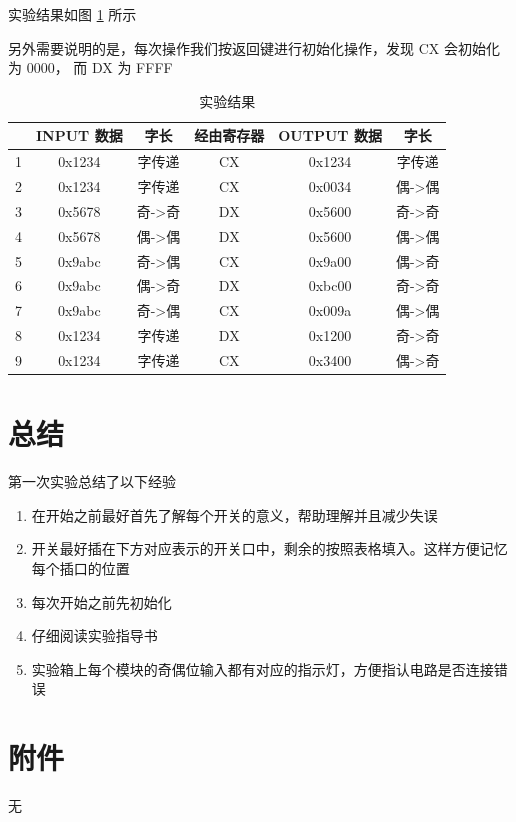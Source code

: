 \documentclass[a4paper,10pt,UTF8]{paper}
\numberwithin{equation}{section}
\numberwithin{figure}{section}
\begin{document}
实验结果如图 \ref{tab:outcome} 所示

另外需要说明的是，每次操作我们按返回键进行初始化操作，发现 CX 会初始化为 0000， 而 DX 为 FFFF

\begin{table}[h]
    \centering
    \begin{tabular}{|c|c|c|c|c|c|}
        \hline  & INPUT 数据 & 字长 & 经由寄存器 & OUTPUT 数据 & 字长 \\
        \hline 1 & 0x1234 & 字传递 & CX & 0x1234 & 字传递 \\
        \hline 2 & 0x1234 & 字传递 & CX & 0x0034 & 偶->偶 \\
        \hline 3 & 0x5678 & 奇->奇 & DX & 0x5600 & 奇->奇 \\
        \hline 4 & 0x5678 & 偶->偶 & DX & 0x5600 & 偶->偶 \\
        \hline 5 & 0x9abc & 奇->偶 & CX & 0x9a00 & 偶->奇 \\
        \hline 6 & 0x9abc & 偶->奇 & DX & 0xbc00 & 奇->奇 \\
        \hline 7 & 0x9abc & 奇->偶 & CX & 0x009a & 偶->偶 \\
        \hline 8 & 0x1234 & 字传递 & DX & 0x1200 & 奇->奇 \\
        \hline 9 & 0x1234 & 字传递 & CX & 0x3400 & 偶->奇 \\
        \hline
    \end{tabular}
    \caption{实验结果}
    \label{tab:outcome}
\end{table}{}

\section{总结}

第一次实验总结了以下经验

\begin{enumerate}
    \item 在开始之前最好首先了解每个开关的意义，帮助理解并且减少失误
    \item 开关最好插在下方对应表示的开关口中，剩余的按照表格填入。这样方便记忆每个插口的位置
    \item 每次开始之前先初始化
    \item 仔细阅读实验指导书
    \item 实验箱上每个模块的奇偶位输入都有对应的指示灯，方便指认电路是否连接错误
\end{enumerate}{}

\section{附件}

无
\end{document}
